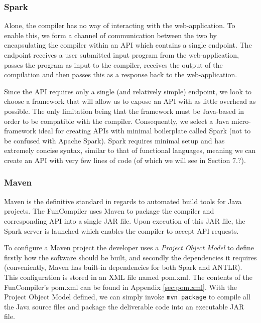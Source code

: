 \documentclass{l4proj}
\begin{document}
\subsubsection{Spark}
Alone, the compiler has no way of interacting with the web-application. To enable this, we form a channel of communication between the two by encapsulating the compiler within an API which contains a single endpoint. The endpoint receives a user submitted input program from the web-application, passes the program as input to the compiler, receives the output of the compilation and then passes this as a response back to the web-application.

Since the API requires only a single (and relatively simple) endpoint, we look to choose a framework that will allow us to expose an API with as little overhead as possible. The only limitation being that the framework must be Java-based in order to be compatible with the compiler. Consequently, we select a Java micro-framework ideal for creating APIs with minimal boilerplate called Spark (not to be confused with Apache Spark). Spark requires minimal setup and has extremely concise syntax, similar to that of functional languages, meaning we can create an API with very few lines of code (of which we will see in Section 7.?).

\subsubsection{Maven}
Maven is the definitive standard in regards to automated build tools for Java projects. The FunCompiler uses Maven to package the compiler and corresponding API into a single JAR file. Upon execution of this JAR file, the Spark server is launched which enables the compiler to accept API requests.

To configure a Maven project the developer uses a \textit{Project Object Model} to define firstly how the software should be built, and secondly the dependencies it requires (conveniently, Maven has built-in dependencies for both Spark and ANTLR). This configuration is stored in an XML file named \textsf{pom.xml}. The contents of the FunCompiler's \textsf{pom.xml} can be found in Appendix \ref{sec:pom.xml}. With the Project Object Model defined, we can simply invoke  \texttt{mvn package} to compile all the Java source files and package the deliverable code into an executable JAR file. 
\end{document}
